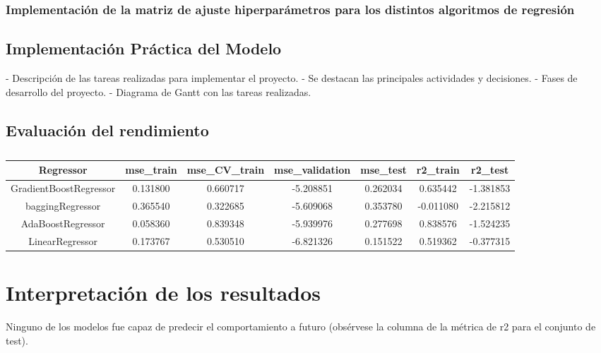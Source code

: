 \documentclass[12pt]{article}
\begin{document}
	
	
	\subsubsection{Implementación de la matriz de ajuste hiperparámetros para los distintos algoritmos de regresión}
	

	\subsection{Implementación Práctica del Modelo}
 	- Descripción de las tareas realizadas para implementar el proyecto.
 	- Se destacan las principales actividades y decisiones.
 	- Fases de desarrollo del proyecto.
 	- Diagrama de Gantt con las tareas realizadas.
 	
 	


	\subsection{Evaluación del rendimiento}
	\begin{table}
	\caption{\label{tabla}}
		\centering
		\begin{tabular}{|c|c|c|c|c|c|c|}
			\hline
			Regressor &	mse\_train &	mse\_CV\_train &	mse\_validation &	mse\_test &	r2\_train &	r2\_test \\
			\hline
			GradientBoostRegressor &	0.131800 &	0.660717 &	-5.208851 &	0.262034 &	0.635442 &	-1.381853 \\
			baggingRegressor &	0.365540 &	0.322685 &	-5.609068 &	0.353780 &	-0.011080 &	-2.215812 \\
			AdaBoostRegressor &	0.058360 &	0.839348 &	-5.939976 &	0.277698 &	0.838576 &	-1.524235 \\
			LinearRegressor &	0.173767 &	0.530510 &	-6.821326 &	0.151522 &	0.519362 &	-0.377315 \\
			\hline
		\end{tabular}
	\end{table}

\newpage
\section{\label{interpretacion}Interpretación de los resultados}
Ninguno de los modelos fue capaz de predecir el comportamiento a futuro (obsérvese la columna de la métrica de r2 para el conjunto de test).
\end{document}
